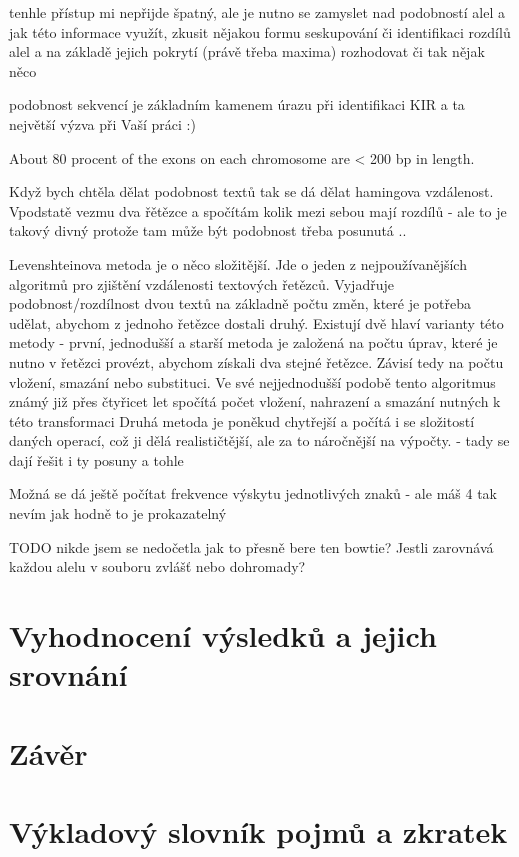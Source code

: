 \documentclass[czech,DP]{thesiskiv}
\numberwithin{equation}{section}
\begin{document}
tenhle přístup mi nepřijde špatný, ale je nutno se zamyslet nad podobností alel a jak této informace využít, zkusit nějakou formu seskupování či identifikaci rozdílů alel a na základě jejich pokrytí (právě třeba maxima) rozhodovat či tak nějak něco


podobnost sekvencí je základním kamenem úrazu při identifikaci KIR a ta největší výzva při Vaší práci :)

About 80 procent of the exons on each chromosome are < 200 bp in length.

Když bych chtěla dělat podobnost textů tak se dá dělat hamingova vzdálenost. Vpodstatě vezmu dva řětězce a spočítám kolik mezi sebou mají rozdílů
- ale to je takový divný protože tam může být podobnost třeba posunutá ..

Levenshteinova metoda je o něco složitější. Jde o jeden z nejpoužívanějších algoritmů
pro zjištění vzdálenosti textových řetězců. Vyjadřuje podobnost/rozdílnost dvou textů na
základně počtu změn, které je potřeba udělat, abychom z jednoho řetězce dostali druhý.
Existují dvě hlaví varianty této metody - první, jednodušší a starší metoda je založená
na počtu úprav, které je nutno v řetězci provézt, abychom získali dva stejné řetězce.
Závisí tedy na počtu vložení, smazání nebo substituci. Ve své nejjednodušší podobě tento
algoritmus známý již přes čtyřicet let spočítá počet vložení, nahrazení a smazání nutných
k této transformaci
Druhá metoda je poněkud chytřejší a počítá i se složitostí daných operací, což ji dělá
realističtější, ale za to náročnější na výpočty.
- tady se dají řešit i ty posuny a tohle

Možná se dá ještě počítat frekvence výskytu jednotlivých znaků - ale máš 4 tak nevím jak hodně to je prokazatelný

TODO nikde jsem se nedočetla jak to přesně bere ten bowtie? Jestli zarovnává každou alelu v souboru zvlášť nebo dohromady? 
\chapter{Vyhodnocení výsledků a jejich srovnání}
\chapter{Závěr}

\chapter{Výkladový slovník pojmů a zkratek}
\end{document}
